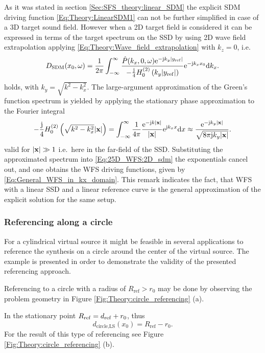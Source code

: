 \vspace{3mm}
As it was stated in section \ref{Sec:SFS_theory:linear_SDM} the explicit SDM driving function \eqref{Eq:Theory:LinearSDM1} can not be further simplified in case of a 3D target sound field.
However when a 2D target field is considered it can be expressed in terms of the target spectrum on the SSD by using 2D wave field extrapolation applying \eqref{Eq:Theory:Wave_field_extrapolation} with $k_z = 0$, i.e.\ %
 \begin{equation}
D_{\mathrm{SDM}}(x_0,\omega) = \frac{1}{2\pi} \int_{-\infty}^{\infty} \frac{ \hat{P}(k_x,0,\omega) \mathrm{e}^{-\mathrm{j} k_y |y_{\mathrm{ref}}|}}{
-\frac{\mathrm{j}}{4}H_0^{(2)}\left( k_y |y_{\mathrm{ref}}| \right) }
\mathrm{e}^{-\mathrm{j} k_x x_0 }
\mathrm{d} k_x.
\label{Eq:25D_WFS:2D_sdm}
\end{equation}
holds, with $k_y = \sqrt{k^2-k_x^2}$.
The large-argument approximation of the Green's function spectrum is yielded by applying the stationary phase approximation to the Fourier integral 
\begin{equation}
-\frac{\mathrm{j}}{4} H_0^{(2)} \left( \sqrt{k^2-k_x^2} |\mathbf{x}| \right)  = \int_{-\infty}^{\infty} \frac{1}{4\pi} \frac{\mathrm{e}^{-\mathrm{j} k|\mathbf{x}|}}{|\mathbf{x}|}
\mathrm{e}^{\mathrm{j} k_x x} \mathrm{d} x
\approx  
\frac{\mathrm{e}^{-\mathrm{j} k_y |\mathbf{x}|}}{\sqrt{8\pi\mathrm{j} k_y |\mathbf{x}|}}.
\end{equation}
valid for $|\mathbf{x}| \gg 1$ i.e.\ here in the far-field of the SSD.
Substituting the approximated spectrum into \eqref{Eq:25D_WFS:2D_sdm} the exponentials cancel out, and one obtains the WFS driving functions, given by \eqref{Eq:General_WFS_in_kx_domain}.
This remark indicates the fact, that WFS with a linear SSD and a linear reference curve is the general approximation of the explicit solution for the same setup.

\subsubsection{Referencing along a circle}
For a cylindrical virtual source it might be feasible in several applications to reference the synthesis on a circle around the center of the virtual source.
The example is presented in order to demonstrate the validity of the presented referencing approach.

Referencing to a circle with a radius of $R_{\mathrm{ref}} > r_0$ may be done by observing the problem geometry in Figure \ref{Fig:Theory:circle_referencing} (a).

In the stationary point $R_{\mathrm{ref}} = d_{\mathrm{ref}} + r_0$, thus
%
\begin{equation}
d_\text{circle,LS}(x_0) = R_{\mathrm{ref}} - r_0.
\label{Eq:dCircleLS}
\end{equation}
For the result of this type of referencing see Figure \ref{Fig:Theory:circle_referencing} (b).

